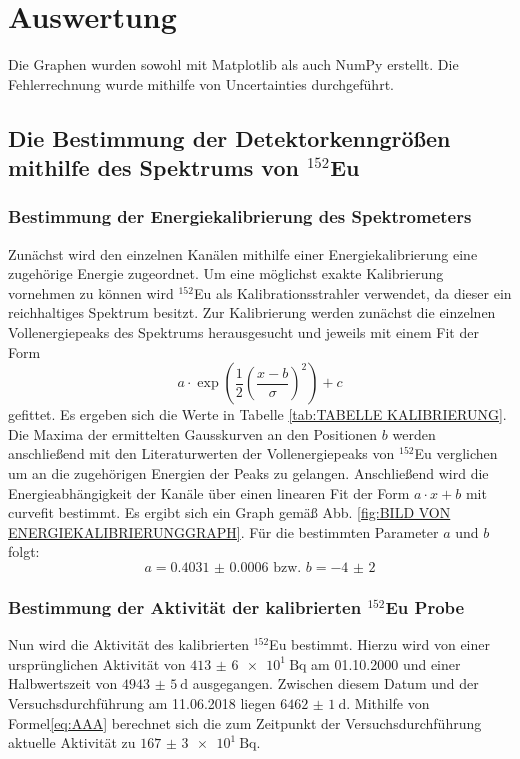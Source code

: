 \section{Auswertung}
\label{sec:Auswertung}
Die Graphen wurden sowohl mit Matplotlib \cite{matplotlib} als auch NumPy \cite{numpy} erstellt. Die
Fehlerrechnung wurde mithilfe von Uncertainties \cite{uncertainties} durchgeführt.
\subsection{Die Bestimmung der Detektorkenngrößen mithilfe des Spektrums von $^{152}$Eu} 
\subsubsection{Bestimmung der Energiekalibrierung des Spektrometers}
Zunächst wird den einzelnen Kanälen mithilfe einer Energiekalibrierung eine zugehörige Energie zugeordnet. Um eine möglichst exakte Kalibrierung vornehmen zu können wird $^{152}$Eu als Kalibrationsstrahler verwendet, da dieser ein reichhaltiges Spektrum besitzt. Zur Kalibrierung werden zunächst die einzelnen Vollenergiepeaks des Spektrums herausgesucht und jeweils mit einem Fit der Form
\begin{equation}
    a \cdot \exp\left(\frac{1}{2}\left( \frac{x-b}{\sigma}\right)^2\right) +c
\end{equation}
gefittet. Es ergeben sich die Werte in Tabelle \ref{tab:TABELLE KALIBRIERUNG}. Die Maxima der ermittelten Gausskurven an den Positionen $b$ werden anschließend mit den Literaturwerten der Vollenergiepeaks von $^{152}$Eu\cite{Eu152} verglichen um an die zugehörigen Energien der Peaks zu gelangen. Anschließend wird die Energieabhängigkeit der Kanäle über einen linearen Fit der Form $a \cdot x+b $ mit curvefit \cite{scipy} bestimmt. Es ergibt sich ein Graph gemäß Abb. \ref{fig:BILD VON ENERGIEKALIBRIERUNGGRAPH}. Für die bestimmten Parameter $a$ und $b$ folgt:
\begin{equation}
a = \num{0.4031(6)} \text{ bzw. } b = \num{-4(2)}
\end{equation}

\subsubsection{Bestimmung der Aktivität der kalibrierten $^{152}$Eu Probe}
Nun wird die Aktivität des kalibrierten $^{152}$Eu bestimmt. Hierzu wird von einer ursprünglichen Aktivität von $\SI{413(6)e1}{\becquerel}$ am 01.10.2000 und einer Halbwertszeit von $\SI{4943(5)}{\day}$ \cite{V18} ausgegangen. Zwischen diesem Datum und der Versuchsdurchführung am 11.06.2018 liegen $\SI{6462(1)}{\day}$. Mithilfe von Formel\eqref{eq:AAA} berechnet sich die zum Zeitpunkt der Versuchsdurchführung aktuelle Aktivität zu $\SI{167(3)e1}{\becquerel}$.

